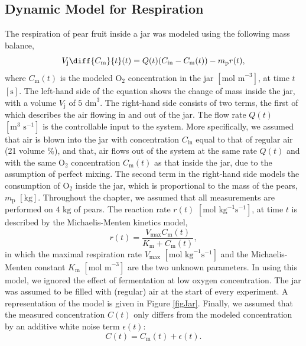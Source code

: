 \subsection{Dynamic Model for Respiration}
\label{Model}
The respiration of pear fruit inside a jar was modeled using the following mass balance,
\begin{equation}
\label{systemP1}
V_\text{j}\diff{C_\text{m}}{t}(t) = Q(t)(C_{\text{in}} - C_\text{m}(t)) - m_\text{p}r(t),
\end{equation}
where $C_\text{m}(t)$ is the modeled $\text{O}_2$ concentration in the jar $[\text{mol m}^{-3}] $, at time $t$ $[\text{s}]$. The left-hand side of the equation shows the change of mass inside the jar, with a volume $V_\text{j}$ of $5\text{ dm}^3$. The right-hand side consists of two terms, the first of which describes the air flowing in and out of the jar. The flow rate $Q(t)$ $[\text{m}^3\text{ s}^{-1}]$ is the controllable input to the system. More specifically, we assumed that air is blown into the jar with concentration $C_{\text{in}}$ equal to that of regular air (21 volume \%), and that, air flows out of the system at the same rate $Q(t)$ and with the same $\text{O}_2$ concentration $C_\text{m}(t)$ as that inside the jar, due to the assumption of perfect mixing. The second term in the right-hand side models the consumption of $\text{O}_2$ inside the jar, which is proportional to the mass of the pears, $m_\text{p}$ $[\text{kg}]$. Throughout the chapter, we assumed that all measurements are performed on $4 \text{ kg}$ of pears. The reaction rate $r(t)$ $[\text{mol kg}^{-1}\text{s}^{-1}]$, at time $t$ is described by the Michaelis-Menten kinetics model,
\begin{equation}
r(t) = \frac{V_{\text{max}}C_\text{m}(t)}{K_\text{m} + C_\text{m}(t)},
\end{equation}
in which the maximal respiration rate $V_{\text{max}}$ $[\text{mol kg}^{-1}\text{s}^{-1}]$ and the Michaelis-Menten constant $K_\text{m}$ $[\text{mol m}^{-3}]$ are the two unknown parameters. In using this model, we ignored the effect of fermentation at low oxygen concentration. The jar was assumed to be filled with (regular) air at the start of every experiment. A representation of the model is given in Figure \ref{figJar}. Finally, we assumed that the measured concentration $C(t)$ only differs from the modeled concentration by an additive white noise term $\epsilon(t)$:
\begin{equation}
C(t) = C_\text{m}(t) + \epsilon(t).
\end{equation}
